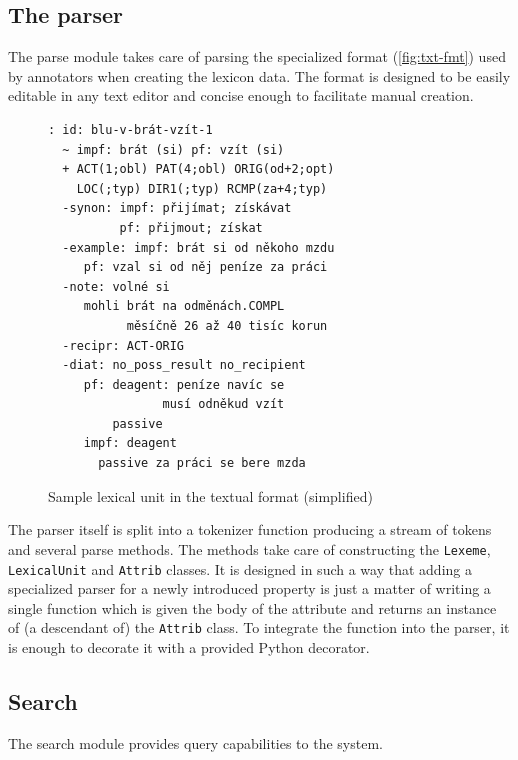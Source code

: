 \documentclass[10pt, a4paper]{article}
\newcommand{\py}[1]{{\tt #1}}
\begin{document}
\subsection{The parser}\label{parser}
The parse module takes care of parsing the specialized format (\autoref{fig:txt-fmt}) used by annotators when creating the lexicon data. The format %
is designed to be easily editable in any text editor and concise enough to facilitate manual creation.

\begin{figure}
\small
\begin{verbatim}
: id: blu-v-brát-vzít-1
  ~ impf: brát (si) pf: vzít (si)
  + ACT(1;obl) PAT(4;obl) ORIG(od+2;opt)
    LOC(;typ) DIR1(;typ) RCMP(za+4;typ)
  -synon: impf: přijímat; získávat
          pf: přijmout; získat
  -example: impf: brát si od někoho mzdu
     pf: vzal si od něj peníze za práci
  -note: volné si
     mohli brát na odměnách.COMPL
           měsíčně 26 až 40 tisíc korun
  -recipr: ACT-ORIG
  -diat: no_poss_result no_recipient
     pf: deagent: peníze navíc se
                musí odněkud vzít
         passive
     impf: deagent
       passive za práci se bere mzda
\end{verbatim}
\caption{\label{fig:txt-fmt}Sample lexical unit in the textual format (simplified)}
\end{figure}

The parser itself is split into a tokenizer function producing a stream of tokens and several
parse methods. The methods take care of constructing the \py{Lexeme}, \py{LexicalUnit}
and \py{Attrib} classes. It is designed in such a way that adding a specialized parser for
a newly introduced property is just a matter of writing a single function which is given
the body of the attribute and returns an instance of (a descendant of) the \py{Attrib} class.
To integrate the function into the parser, it is enough to decorate it with a provided
Python decorator.

\subsection{Search}
The search module provides query capabilities to the system.
\end{document}
